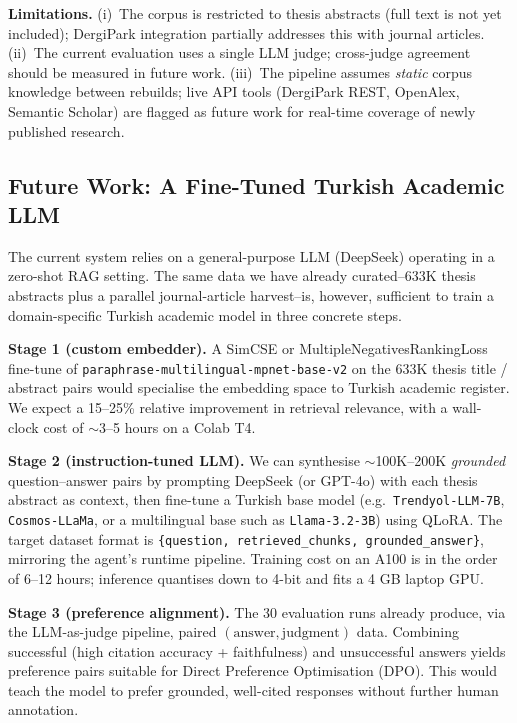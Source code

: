 \documentclass[conference]{IEEEtran}
\begin{document}
\textbf{Limitations.}
(i)~The corpus is restricted to thesis abstracts (full text is not yet
included); DergiPark integration partially addresses this with journal
articles. (ii)~The current evaluation uses a single LLM judge; cross-judge
agreement should be measured in future work. (iii)~The pipeline assumes
\emph{static} corpus knowledge between rebuilds; live API tools (DergiPark
REST, OpenAlex, Semantic Scholar) are flagged as future work for real-time
coverage of newly published research.

\subsection{Future Work: A Fine-Tuned Turkish Academic LLM}
\label{sec:future}

The current system relies on a general-purpose LLM (DeepSeek) operating in a
zero-shot RAG setting. The same data we have already curated--633K thesis
abstracts plus a parallel journal-article harvest--is, however, sufficient
to train a domain-specific Turkish academic model in three concrete steps.

\textbf{Stage 1 (custom embedder).} A SimCSE or
MultipleNegativesRankingLoss fine-tune of
\texttt{paraphrase-multilingual-mpnet-base-v2} on the 633K thesis title /
abstract pairs would specialise the embedding space to Turkish academic
register. We expect a 15--25\% relative improvement in retrieval relevance,
with a wall-clock cost of $\sim$3--5 hours on a Colab T4.

\textbf{Stage 2 (instruction-tuned LLM).} We can synthesise
$\sim$100K--200K \emph{grounded} question--answer pairs by prompting
DeepSeek (or GPT-4o) with each thesis abstract as context, then fine-tune
a Turkish base model (e.g.\ \texttt{Trendyol-LLM-7B}, \texttt{Cosmos-LLaMa},
or a multilingual base such as \texttt{Llama-3.2-3B}) using QLoRA. The
target dataset format is \texttt{\{question, retrieved\_chunks, grounded\_answer\}},
mirroring the agent's runtime pipeline. Training cost on an A100 is in the
order of 6--12 hours; inference quantises down to 4-bit and fits a 4 GB
laptop GPU.

\textbf{Stage 3 (preference alignment).} The 30 evaluation runs already
produce, via the LLM-as-judge pipeline, paired
$(\text{answer}, \text{judgment})$ data. Combining successful (high
citation accuracy + faithfulness) and unsuccessful answers yields preference
pairs suitable for Direct Preference Optimisation (DPO). This would teach
the model to prefer grounded, well-cited responses without further
human annotation.
\end{document}
